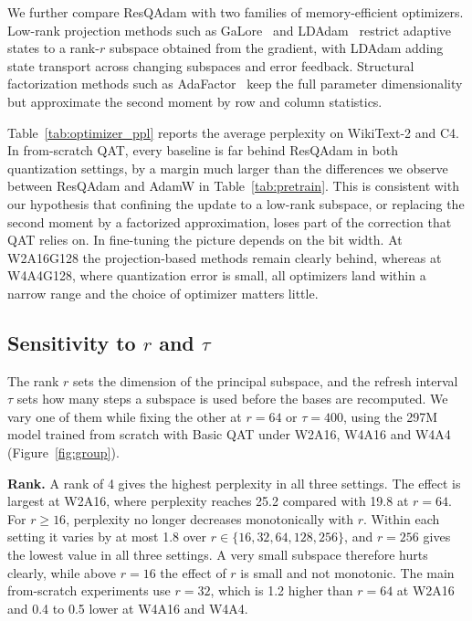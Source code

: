 \documentclass{article} %
\begin{document}
We further compare ResQAdam with two families of memory-efficient optimizers. Low-rank projection methods such as GaLore~\citep{zhao2024galore} and LDAdam~\citep{robert2025ldadam} restrict adaptive states to a rank-$r$ subspace obtained from the gradient, with LDAdam adding state transport across changing subspaces and error feedback. Structural factorization methods such as AdaFactor~\citep{shazeer2018adafactor} keep the full parameter dimensionality but approximate the second moment by row and column statistics.

Table~\ref{tab:optimizer_ppl} reports the average perplexity on WikiText-2 and C4. In from-scratch QAT, every baseline is far behind ResQAdam in both quantization settings, by a margin much larger than the differences we observe between ResQAdam and AdamW in Table~\ref{tab:pretrain}. This is consistent with our hypothesis that confining the update to a low-rank subspace, or replacing the second moment by a factorized approximation, loses part of the correction that QAT relies on. In fine-tuning the picture depends on the bit width. At W2A16G128 the projection-based methods remain clearly behind, whereas at W4A4G128, where quantization error is small, all optimizers land within a narrow range and the choice of optimizer matters little.

\subsection{Sensitivity to $r$ and $\tau$}
\label{sec:sensitivity}
The rank $r$ sets the dimension of the principal subspace, and the refresh interval $\tau$ sets how many steps a subspace is used before the bases are recomputed. We vary one of them while fixing the other at $r=64$ or $\tau=400$, using the 297M model trained from scratch with Basic QAT under W2A16, W4A16 and W4A4 (Figure~\ref{fig:group}).

\textbf{Rank.} A rank of 4 gives the highest perplexity in all three settings. The effect is largest at W2A16, where perplexity reaches 25.2 compared with 19.8 at $r=64$. For $r\geq 16$, perplexity no longer decreases monotonically with $r$. Within each setting it varies by at most 1.8 over $r\in\{16,32,64,128,256\}$, and $r=256$ gives the lowest value in all three settings. A very small subspace therefore hurts clearly, while above $r=16$ the effect of $r$ is small and not monotonic. The main from-scratch experiments use $r=32$, which is 1.2 higher than $r=64$ at W2A16 and 0.4 to 0.5 lower at W4A16 and W4A4.
\end{document}
